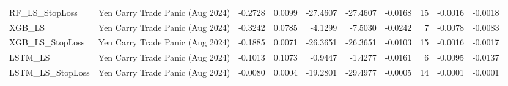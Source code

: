 \begin{tabular}{llrrrrrrrr}
\cline{1-10}
RF\_LS\_StopLoss & Yen Carry Trade Panic (Aug 2024) & -0.2728 & 0.0099 & -27.4607 & -27.4607 & -0.0168 & 15 & -0.0016 & -0.0018 \\
\cline{1-10}
XGB\_LS & Yen Carry Trade Panic (Aug 2024) & -0.3242 & 0.0785 & -4.1299 & -7.5030 & -0.0242 & 7 & -0.0078 & -0.0083 \\
\cline{1-10}
XGB\_LS\_StopLoss & Yen Carry Trade Panic (Aug 2024) & -0.1885 & 0.0071 & -26.3651 & -26.3651 & -0.0103 & 15 & -0.0016 & -0.0017 \\
\cline{1-10}
LSTM\_LS & Yen Carry Trade Panic (Aug 2024) & -0.1013 & 0.1073 & -0.9447 & -1.4277 & -0.0161 & 6 & -0.0095 & -0.0137 \\
\cline{1-10}
LSTM\_LS\_StopLoss & Yen Carry Trade Panic (Aug 2024) & -0.0080 & 0.0004 & -19.2801 & -29.4977 & -0.0005 & 14 & -0.0001 & -0.0001 \\
\cline{1-10}
\bottomrule
\end{tabular}
